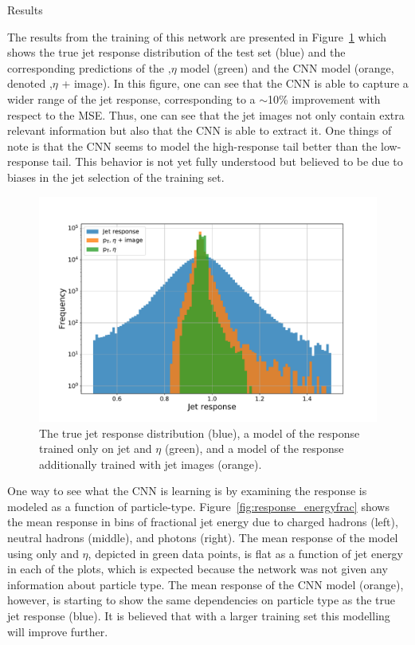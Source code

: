 \begin{section}{Results}

The results from the training of this network are presented in Figure~\ref{fig:cnn_prediction} which shows the true jet response distribution of the test set (blue) and the corresponding predictions of the \pT,$\eta$ model (green) and the CNN model (orange, denoted \pT,$\eta$ + image).
In this figure, one can see that the CNN is able to capture a wider range of the jet response, corresponding to a $\sim$10\% improvement with respect to the MSE.
Thus, one can see that the jet images not only contain extra relevant information but also that the CNN is able to extract it.
One things of note is that the CNN seems to model the high-response tail better than the low-response tail.
This behavior is not yet fully understood but believed to be due to biases in the jet selection of the training set.

\begin{figure}[tbp!]
\begin{center}
\includegraphics[angle=0,width=0.80\columnwidth]{fig/cnn_prediction.pdf}
\end{center}
\caption{The true jet response distribution (blue), a model of the response trained only on jet \pT and $\eta$ (green), and a model of the response additionally trained with jet images (orange).}
\label{fig:cnn_prediction}
\end{figure}

One way to see what the CNN is learning is by examining the response is modeled as a function of particle-type.
Figure~\ref{fig:response_energyfrac} shows the mean response in bins of fractional jet energy due to charged hadrons (left), neutral hadrons (middle), and photons (right).
The mean response of the model using only \pT and $\eta$, depicted in green data points, is flat as a function of jet energy in each of the plots, which is expected because the network was not given any information about particle type.
The mean response of the CNN model (orange), however, is starting to show the same dependencies on particle type as the true jet response (blue).
It is believed that with a larger training set this modelling will improve further.


\end{section}
